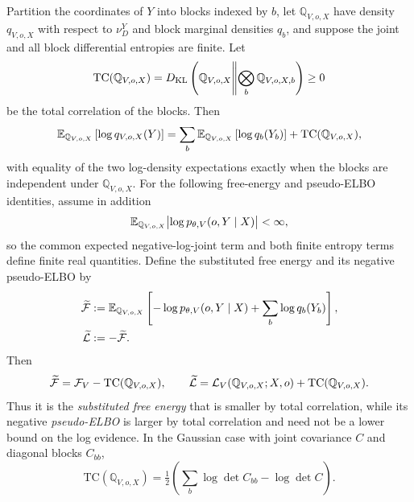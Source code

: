 \medskip
{}
Partition the coordinates of \(Y\) into blocks indexed by \(b\), let \(\mathbb Q_{V,o,X}\) have density \(q_{V,o,X}\) with respect to \(\nu_D^Y\) and block marginal densities \(q_b\), and suppose the joint and all block differential entropies are finite. Let
\begin{equation}
\mathrm{TC}(\mathbb Q_{V,o,X})
=D_{\mathrm{KL}}\left(\mathbb Q_{V,o,X}\middle\Vert
\bigotimes_{b}\mathbb Q_{V,o,X,b}\right)
\geq0
\label{eq:elbo-total-correlation}
\end{equation}
be the total correlation of the blocks. Then
\begin{equation}
\mathbb E_{\mathbb Q_{V,o,X}}\left[\log q_{V,o,X}(Y)\right]
=\sum_{b}\mathbb E_{\mathbb Q_{V,o,X}}\left[\log q_b(Y_b)\right]
+\mathrm{TC}(\mathbb Q_{V,o,X}),
\label{eq:elbo-entropy-defect}
\end{equation}
with equality of the two log-density expectations exactly when the blocks are independent under \(\mathbb Q_{V,o,X}\). For the following free-energy and pseudo-ELBO identities, assume in addition
\[
\mathbb E_{\mathbb Q_{V,o,X}}\bigl|\log p_{\theta,V}(o,Y\mid X)\bigr|<\infty,
\]
so the common expected negative-log-joint term and both finite entropy terms define finite real quantities. Define the substituted free energy and its negative pseudo-ELBO by
\begin{align}
\widetilde{\mathcal F}
&:=\mathbb E_{\mathbb Q_{V,o,X}}\left[-\log p_{\theta,V}(o,Y\mid X)
+\sum_b\log q_b(Y_b)\right],
\label{eq:elbo-substituted-free-energy}\\
\widetilde{\mathcal L}&:=-\widetilde{\mathcal F}.
\label{eq:elbo-pseudo-elbo}
\end{align}
Then
\begin{equation}
\widetilde{\mathcal F}
=\mathcal F_V-\mathrm{TC}(\mathbb Q_{V,o,X}),
\qquad
\widetilde{\mathcal L}
=\mathcal L_V(\mathbb Q_{V,o,X};X,o)
+\mathrm{TC}(\mathbb Q_{V,o,X}).
\label{eq:elbo-total-correlation-signs}
\end{equation}
Thus it is the \emph{substituted free energy} that is smaller by total correlation, while its negative \emph{pseudo-ELBO} is larger by total correlation and need not be a lower bound on the log evidence. In the Gaussian case with joint covariance \(C\) and diagonal blocks \(C_{bb}\),
\begin{equation}
\mathrm{TC}(\mathbb Q_{V,o,X})
=\tfrac12\left(\sum_{b}\log\det C_{bb}-\log\det C\right).
\label{eq:elbo-total-correlation-gaussian}
\end{equation}

